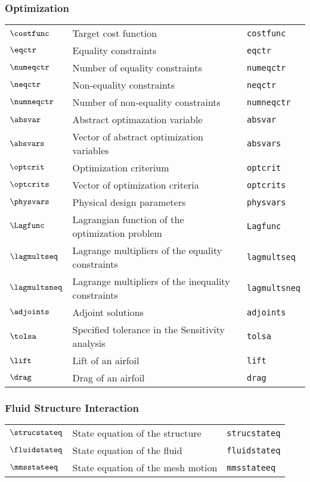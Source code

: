 \subsubsection*{Optimization}
\begin{tabular}{l l l}
$\costfunc$ & Target cost function& \texttt{costfunc}\\
$\eqctr$ & Equality constraints& \texttt{eqctr}\\
$\numeqctr$ & Number of equality constraints& \texttt{numeqctr}\\
$\neqctr$ & Non-equality constraints& \texttt{neqctr}\\
$\numneqctr$ & Number of non-equality constraints& \texttt{numneqctr}\\
$\absvar$ & Abstract optimazation variable& \texttt{absvar}\\
$\absvars$ & Vector of abstract optimization variables& \texttt{absvars}\\
$\optcrit$ & Optimization criterium& \texttt{optcrit}\\
$\optcrits$ & Vector of optimization criteria& \texttt{optcrits}\\
$\physvars$ & Physical design parameters& \texttt{physvars}\\
$\Lagfunc$ & Lagrangian function of the optimization problem& \texttt{Lagfunc}\\
$\lagmultseq$ & Lagrange multipliers of the equality constraints& \texttt{lagmultseq}\\
$\lagmultsneq$ & Lagrange multipliers of the inequality constraints& \texttt{lagmultsneq}\\
$\adjoints$ & Adjoint solutions& \texttt{adjoints}\\
$\tolsa$ & Specified tolerance in the Sensitivity analysis& \texttt{tolsa}\\
$\lift$ & Lift of an airfoil& \texttt{lift}\\
$\drag$ & Drag of an airfoil& \texttt{drag}\\
\end{tabular}

\subsubsection*{Fluid Structure Interaction}
\begin{tabular}{l l l}
$\strucstateq$ & State equation of the structure& \texttt{strucstateq}\\
$\fluidstateq$ & State equation of the fluid& \texttt{fluidstateq}\\
$\mmsstateeq$ & State equation of the mesh motion& \texttt{mmsstateeq}\\
\end{tabular}

